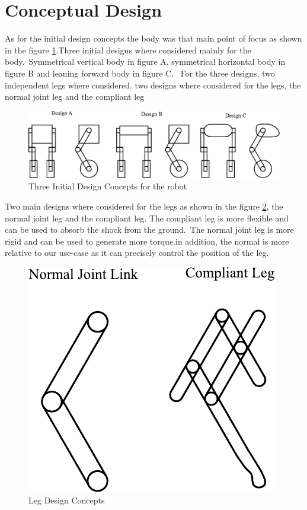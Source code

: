 \section{Conceptual Design}
As for the initial design concepts the body was that main point of focus as shown in the figure \ref{fig:initialdesigns}.Three initial designs where considered mainly for the body.\ Symmetrical vertical body in figure A, symmetrical horizontal body in figure B and leaning forward body in figure C\@.
\ For the three designs, two independent legs where considered.
two designs where considered for the legs, the normal joint leg and the compliant leg

\begin{figure}[h]
	\centering
	\includegraphics[width=1\linewidth]{Conceptual Design}
	\caption[Initial Design Concepts]{Three Initial Design Concepts for the robot}
	\label{fig:initialdesigns}
\end{figure}
Two main designs where considered for the legs as shown in the figure \ref{fig:legdesignsjbhi}, the normal joint leg and the compliant leg.
The compliant leg is more flexible and can be used to absorb the shock from the ground.\ The normal joint leg is more rigid and can be used to generate more torque.in addition, the normal is more relative to our use-case as it can precisely control the position of the leg.
\begin{figure}[h]
	\centering
	\includegraphics[width=0.4\linewidth]{Leg Design}
	\caption[Leg Design Concepts]{Leg Design Concepts}
	\label{fig:legdesignsjbhi}
\end{figure}

